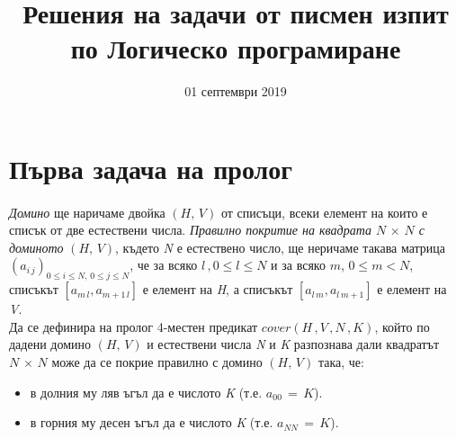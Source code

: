 \documentclass[12pt]{article}
\title{Решения на задачи от писмен изпит по Логическо програмиране}
\date{01 септември 2019}
\begin{document}
\maketitle %
\newpage
\tableofcontents
{} %
\newpage %
\section{Първа задача на пролог}
\paragraph{}
\textit{Домино} ще наричаме двойка $(H,\,V)$ от списъци, всеки елемент на които е списък от две естествени числа.
\textit{Правилно покритие на квадрата $N\, \times \, N$ с доминото} $(H,\,V)$, където \textit{N} е естествено число, ще неричаме такава матрица 
$(a_{i\,j})_{0 \leq i \leq N,\, 0\leq j \leq N}$, че за всяко $l\,, 0 \leq l \leq N$ и за всяко $m$, $0 \leq m < N$, списъкът $[a_{m\,l},a_{m+1\,l}]$ е елемент на \textit{H}, а списъкът $[a_{l\,m},a_{l\,m+1}]$ е елемент на \textit{V}.\\
Да се дефинира на пролог 4-местен предикат $cover(H\,,V\,,N\,,K)$, който по дадени домино  $(H,\,V)$ и естествени числа \textit{N} и \textit{K} разпознава дали квадратът $N\, \times \, N$ може да се покрие правилно с домино $(H,\,V)$ така, че:\\ 
\begin{itemize}
    \item в долния му ляв ъгъл да е числото \textit{K} (т.е. $a_{00}\,=\,K$).
    \item в горния му десен ъгъл да е числото \textit{K} (т.е. $a_{NN}\,=\,K$).
\end{itemize}
\end{document}

